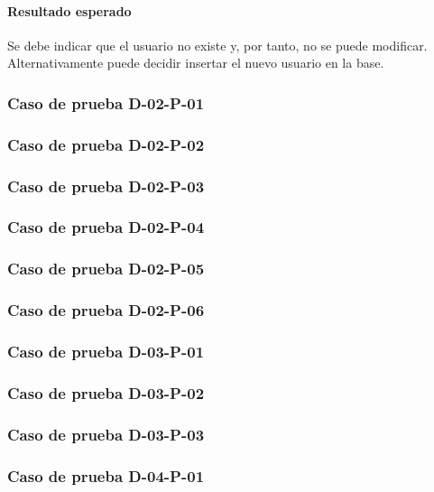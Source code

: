 \documentclass[10pt,a4paper]{article}
\begin{document}
				\paragraph{Resultado esperado} Se debe indicar que el usuario no existe y, por tanto, no se puede modificar. Alternativamente puede decidir insertar el nuevo usuario en la base.

			\subsubsection{Caso de prueba D-02-P-01}

			\subsubsection{Caso de prueba D-02-P-02}

			\subsubsection{Caso de prueba D-02-P-03}

			\subsubsection{Caso de prueba D-02-P-04}

			\subsubsection{Caso de prueba D-02-P-05}

			\subsubsection{Caso de prueba D-02-P-06}

			\subsubsection{Caso de prueba D-03-P-01}

			\subsubsection{Caso de prueba D-03-P-02}

			\subsubsection{Caso de prueba D-03-P-03}

			\subsubsection{Caso de prueba D-04-P-01}
\end{document}
